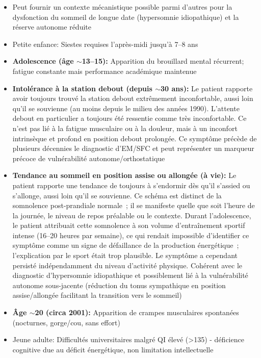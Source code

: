 \begin{description}
\begin{itemize}
        \item Peut fournir un contexte mécanistique possible parmi d'autres pour la dysfonction du sommeil de longue date (hypersomnie idiopathique) et la réserve autonome réduite
        \item Petite enfance: Siestes requises l'après-midi jusqu'à 7--8 ans
        \item \textbf{Adolescence (âge $\sim$13--15):} Apparition du brouillard mental récurrent; fatigue constante mais performance académique maintenue
        \item \textbf{Intolérance à la station debout (depuis $\sim$30 ans):} Le patient rapporte avoir toujours trouvé la station debout extrêmement inconfortable, aussi loin qu'il se souvienne (au moins depuis le milieu des années 1990). L'attente debout en particulier a toujours été ressentie comme très inconfortable. Ce n'est pas lié à la fatigue musculaire ou à la douleur, mais à un inconfort intrinsèque et profond en position debout prolongée. Ce symptôme précède de plusieurs décennies le diagnostic d'EM/SFC et peut représenter un marqueur précoce de vulnérabilité autonome/orthostatique
        \item \textbf{Tendance au sommeil en position assise ou allongée (à vie):} Le patient rapporte une tendance de toujours à s'endormir dès qu'il s'assied ou s'allonge, aussi loin qu'il se souvienne. Ce schéma est distinct de la somnolence post-prandiale normale~; il se manifeste quelle que soit l'heure de la journée, le niveau de repos préalable ou le contexte. Durant l'adolescence, le patient attribuait cette somnolence à son volume d'entraînement sportif intense (16--20 heures par semaine), ce qui rendait impossible d'identifier ce symptôme comme un signe de défaillance de la production énergétique~; l'explication par le sport était trop plausible. Le symptôme a cependant persisté indépendamment du niveau d'activité physique. Cohérent avec le diagnostic d'hypersomnie idiopathique et possiblement lié à la vulnérabilité autonome sous-jacente (réduction du tonus sympathique en position assise/allongée facilitant la transition vers le sommeil)
        \item \textbf{Âge $\sim$20 (circa 2001):} Apparition de crampes musculaires spontanées (nocturnes, gorge/cou, sans effort)
        \item Jeune adulte: Difficultés universitaires malgré QI élevé (>135) - déficience cognitive due au déficit énergétique, non limitation intellectuelle
        \begin{itemize}

\end{itemize}
\end{itemize}
\end{description}
